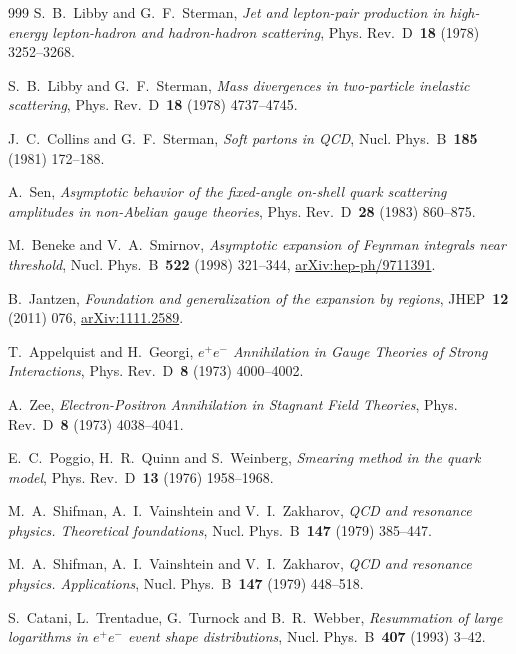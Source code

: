 \begin{thebibliography}{999}
S.~B.~Libby and G.~F.~Sterman, \emph{Jet and lepton-pair production in high-energy lepton-hadron and hadron-hadron scattering}, Phys. Rev.~D~\textbf{18} (1978) \mbox{3252--3268}.

S.~B.~Libby and G.~F.~Sterman, \emph{Mass divergences in two-particle inelastic scattering}, Phys. Rev.~D~\textbf{18} (1978) \mbox{4737--4745}.

J.~C.~Collins and G.~F.~Sterman, \emph{Soft partons in QCD}, Nucl. Phys.~B~\textbf{185} (1981) \mbox{172--188}.

A.~Sen, \emph{Asymptotic behavior of the fixed-angle on-shell quark scattering amplitudes in non-Abelian gauge theories}, Phys. Rev.~D~\textbf{28} (1983) \mbox{860--875}.

M.~Beneke and V.~A.~Smirnov, \emph{Asymptotic expansion of Feynman integrals near threshold}, Nucl. Phys.~B~\textbf{522} (1998) \mbox{321--344}, \href{https://arxiv.org/abs/hep-ph/9711391}{arXiv:hep-ph/9711391}.

B.~Jantzen, \emph{Foundation and generalization of the expansion by regions}, JHEP~\textbf{12} (2011) \mbox{076}, \href{https://arxiv.org/abs/1111.2589}{arXiv:1111.2589}.

T.~Appelquist and H.~Georgi, \emph{$e^+e^-$ Annihilation in Gauge Theories of Strong Interactions}, Phys. Rev.~D~\textbf{8} (1973) \mbox{4000--4002}.

A.~Zee, \emph{Electron-Positron Annihilation in Stagnant Field Theories}, Phys. Rev.~D~\textbf{8} (1973) \mbox{4038--4041}.

E.~C.~Poggio, H.~R.~Quinn and S.~Weinberg, \emph{Smearing method in the quark model}, Phys. Rev.~D~\textbf{13} (1976) \mbox{1958--1968}.

M.~A.~Shifman, A.~I.~Vainshtein and V.~I.~Zakharov, \emph{QCD and resonance physics. Theoretical foundations}, Nucl. Phys.~B~\textbf{147} (1979) \mbox{385--447}.

M.~A.~Shifman, A.~I.~Vainshtein and V.~I.~Zakharov, \emph{QCD and resonance physics. Applications}, Nucl. Phys.~B~\textbf{147} (1979) \mbox{448--518}.

S.~Catani, L.~Trentadue, G.~Turnock and B.~R.~Webber, \emph{Resummation of large logarithms in $e^+e^-$ event shape distributions}, Nucl. Phys.~B~\textbf{407} (1993) \mbox{3--42}.


\end{thebibliography}
